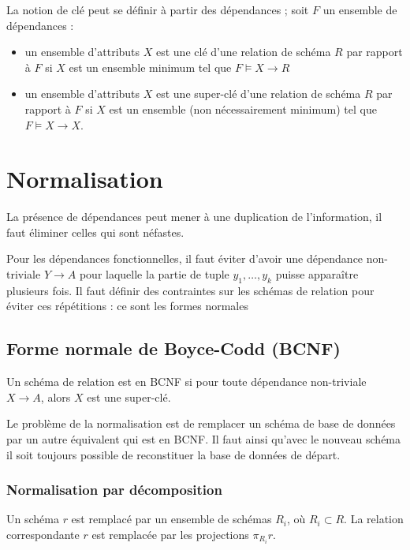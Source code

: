 		La notion de clé peut se définir à partir des dépendances ; soit $F$ un ensemble de dépendances :
		
		\begin{itemize}
			\item un ensemble d'attributs $X$ est une clé d'une relation de schéma $R$ par rapport à $F$ si $X$ est un ensemble minimum tel que $F \models X \rightarrow R$
			\item un ensemble d'attributs $X$ est une super-clé d'une relation de schéma $R$ par rapport à $F$ si $X$ est un ensemble (non nécessairement minimum) tel que $F \models X \rightarrow X$.
		\end{itemize}
		
		
	\section{Normalisation}
	
	La présence de dépendances peut mener à une duplication de l'information, il faut éliminer celles qui sont néfastes.
		
	Pour les dépendances fonctionnelles, il faut éviter d'avoir une dépendance non-triviale $Y \rightarrow A$ pour laquelle la partie de tuple $y_1,  \dots , y_k$ puisse apparaître plusieurs fois. Il faut définir des contraintes sur les schémas de relation pour éviter ces répétitions : ce sont les formes normales
		
		\subsection{Forme normale de Boyce-Codd (BCNF)}
		
		Un schéma de relation est en BCNF si pour toute dépendance non-triviale $X \rightarrow A$, alors $X$ est une super-clé.
		
		Le problème de la normalisation est de remplacer un schéma de base de données par un autre équivalent qui est en BCNF. Il faut ainsi qu'avec le nouveau schéma il soit toujours possible de reconstituer la base de données de départ.
		
			\subsubsection{Normalisation par décomposition}
			
			Un schéma $r$ est remplacé par un ensemble de schémas $R_i$, où $R_i \subset R$. La relation correspondante $r$ est remplacée par les projections $\pi_{R_i} r$.
			
